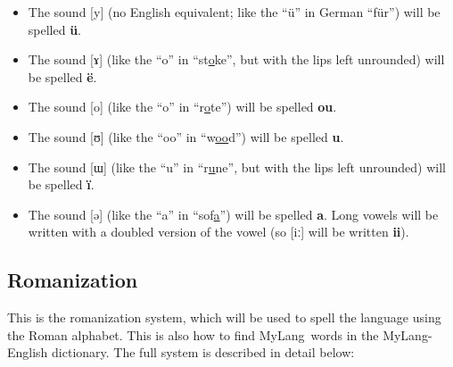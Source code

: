 \documentclass[oneside]{book}
\newcommand{\LanguageName}{MyLang}
\begin{document}
\begin{itemize}
\item
The sound [y] (no English equivalent; like the ``ü'' in German ``für'') will be spelled \textbf{ü}.
\item
The sound [ɤ] (like the ``o'' in ``st\uline{o}ke'', but with the lips left unrounded) will be spelled \textbf{ë}.
\item
The sound [o] (like the ``o'' in ``r\uline{o}te'') will be spelled \textbf{ou}.
\item
The sound [ʊ] (like the ``oo'' in ``w\uline{oo}d'') will be spelled \textbf{u}.
\item
The sound [ɯ] (like the ``u'' in ``r\uline{u}ne'', but with the lips left unrounded) will be spelled \textbf{ï}.
\item
The sound [ǝ] (like the ``a'' in ``sof\uline{a}'') will be spelled \textbf{a}.
Long vowels will be written with a doubled version of the vowel (so [iː] will be written \textbf{ii}).
\end{itemize}

\subsection{Romanization}

This is the romanization system, which will be used to spell the language using the Roman alphabet.
This is also how to find \LanguageName\ words in the \LanguageName-English dictionary.
The full system is described in detail below:
\end{document}
